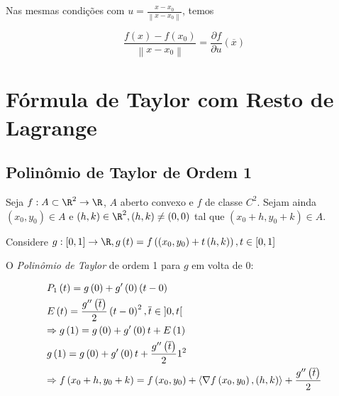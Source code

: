 \documentclass[11pt, oneside, a4paper]{gsm-l}
\begin{document}
\begin{cor}
Nas mesmas condições com $u = \frac{{x - x_0 }}
{{\left\| {x - x_0 } \right\|}}$, temos

\[
\frac{{f\left( x \right) - f\left( {x_0 } \right)}}
{{\left\| {x - x_0 } \right\|}} = \frac{{\partial f}}
{{\partial u}}\left( {\overline x } \right)
\]

\end{cor}

\section{F\'ormula de Taylor com Resto de Lagrange}\label{sec18a}

\subsection{Polin\^omio de Taylor de Ordem 1}

Seja $f:A \subset \R^2 \to \R$, $A$ aberto convexo e $f$ de classe $C^2$. Sejam ainda $\left( {x_0 ,y_0 } \right) \in A$ e $\left( {h,k} \right) \in \R^2 ,\left( {h,k} \right) \ne \left( {0,0} \right)$ tal que $\left( {x_0  + h,y_0  + k} \right) \in A$.

Considere $g:\left[ {0,1} \right] \to \R,g\left( t \right) = f\left( {\left( {x_0 ,y_0 } \right) + t\left( {h,k} \right)} \right),t \in \left[ {0,1} \right]$

O \textit{Polin\^omio de Taylor} de ordem 1 para $g$ em volta de $0$:

\[
\begin{gathered}
  P_1 \left( t \right) = g\left( 0 \right) + g'\left( 0 \right)\left( {t - 0} \right) \hfill \\
E\left( t \right) = \frac{{g''\left( {\overline t } \right)}}
{2}\left( {t - 0} \right)^2 ,\overline t  \in \left] {0,t} \right[ \hfill \\
   \Rightarrow g\left( 1 \right) = g\left( 0 \right) + g'\left( 0 \right)t + E\left( 1 \right) \hfill \\
  g\left( 1 \right) = g\left( 0 \right) + g'\left( 0 \right)t + \frac{{g''\left( {\overline t } \right)}}
{2}1^2  \hfill \\
   \Rightarrow f\left( {x_0  + h,y_0  + k} \right) = f\left( {x_0 ,y_0 } \right) + \left\langle {\nabla f\left( {x_0 ,y_0 } \right),\left( {h,k} \right)} \right\rangle  + \frac{{g''\left( {\overline t } \right)}}
{2} \hfill \\
\end{gathered}
\]
\end{document}
